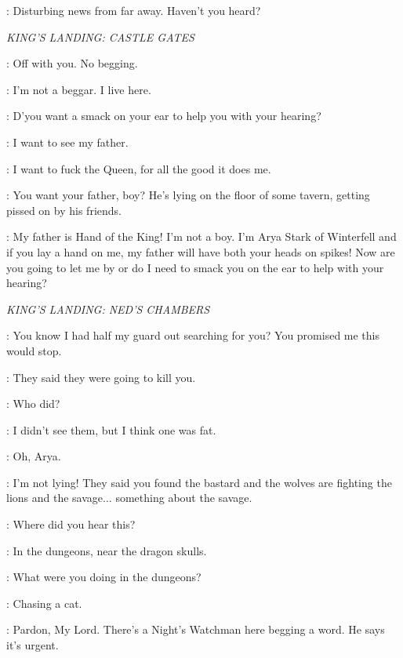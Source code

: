 \VARYS: Disturbing news from far away. Haven't you heard? 

\scene

\textit{KING'S LANDING: CASTLE GATES} 


\GUARDa: Off with you. No begging. 

\ARYA: I'm not a beggar. I live here. 

\GUARDa: D'you want a smack on your ear to help you with your hearing? 

\ARYA: I want to see my father. 

\GUARDb: I want to fuck the Queen, for all the good it does me. 

\GUARDa: You want your father, boy? He's lying on the floor of some tavern, getting pissed on by his friends. 

\ARYA: My father is Hand of the King! I'm not a boy. I'm Arya Stark of Winterfell and if you lay a hand on me, my father will have both your heads on spikes! Now are you going to let me by or do I need to smack you on the ear to help with your hearing? 


\scene

\textit{KING'S LANDING: NED'S CHAMBERS} 


\NED: You know I had half my guard out searching for you? You promised me this would stop. 

\ARYA: They said they were going to kill you. 

\NED: Who did? 

\ARYA: I didn't see them, but I think one was fat. 

\NED: Oh, Arya. 

\ARYA: I'm not lying! They said you found the bastard and the wolves are fighting the lions and the savage$\ldots$ something about the savage. 

\NED: Where did you hear this? 

\ARYA: In the dungeons, near the dragon skulls. 

\NED: What were you doing in the dungeons? 

\ARYA: Chasing a cat. 


\JORY: Pardon, My Lord. There's a Night's Watchman here begging a word. He says it's urgent.

